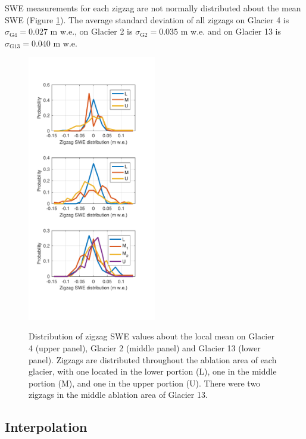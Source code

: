 \documentclass[twocolumn,letterpaper]{igs}
\begin{document}
SWE measurements for each zigzag are not normally distributed about the mean SWE (Figure \ref{fig:ZigzagHistogram}). The average standard deviation of all zigzags on Glacier 4 is $\sigma_{\mathrm{G4}} =  0.027$ m w.e., on Glacier 2 is $\sigma_{\mathrm{G2}} =  0.035$ m w.e. and on Glacier 13 is $\sigma_{\mathrm{G13}} =  0.040$ m w.e.

\begin{figure}
	\centering
	\includegraphics[width =0.5\textwidth]{ZigzagHistogram.pdf}\\
	\caption{Distribution of zigzag SWE values about the local mean on Glacier 4 (upper panel), Glacier 2 (middle panel) and Glacier 13 (lower panel). Zigzags are distributed throughout the ablation area of each glacier, with one located in the lower portion (L), one in the middle portion (M), and one in the upper portion (U). There were two zigzags in the middle ablation area of Glacier 13.}
	\label{fig:ZigzagHistogram}
\end{figure}

\subsection{Interpolation}
\end{document}
